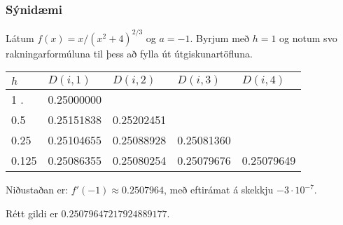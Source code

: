 \documentclass[icelandic,a4paper,12pt]{article}
\begin{document}
%     
%    
% 


\subsubsection{Sýnidæmi} 
Látum $f(x)=x/(x^2+4)^{2/3}$ og $a=-1$.  
Byrjum með $h=1$ og notum svo rakningarformúluna til þess að fylla út útgiskunartöfluna.

\smallskip
\begin{center}
\begin{tabular}{l|llll}
$h$&$D(i,1)$&$D(i,2)$&$D(i,3)$&$D(i,4)$\\\hline
1   .&   0.25000000 \\
0.5  &   0.25151838 &  0.25202451\\
0.25 &   0.25104655 &  0.25088928 &  0.25081360\\
0.125&   0.25086355 &  0.25080254 &  0.25079676 &  0.25079649
\end{tabular}
\end{center}
\pause

Niðustaðan er: $f'(-1)\approx   0.2507964$, 
með eftirámat á skekkju  $-3\cdot 10^{-7}$.  
\pause
\smallskip

Rétt gildi er $0.25079647217924889177$.


\end{document}
